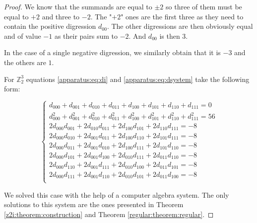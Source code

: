 \begin{proof}
    We know that the summands are equal to $\pm 2$ so three of them must be equal to $+2$ and three to $-2$. The "$+2$" ones are the first three as they need to contain the positive digression $d_{00}$. The other digressions are then obviously equal and of value $-1$ as their pairs sum to $-2$. And $d_{00}$ is then $3$.
    
    In the case of a single negative digression, we similarly obtain that it is $-3$ and the others are $1$.
    
    For $\mathbb Z_2^3$ equations \eqref{apparatus:eq:di} and \eqref{apparatus:eq:dsystem} take the following form:
    
    \begin{equation}
        \begin{cases}
            d_{000} + d_{001} + d_{010} + d_{011} + d_{100} + d_{101} + d_{110} + d_{111} = 0 \\
            d_{000}^2 + d_{001}^2 + d_{010}^2 + d_{011}^2 + d_{100}^2 + d_{101}^2 + d_{110}^2 + d_{111}^2 = 56 \\
            2 d_{000}d_{001} + 2 d_{010}d_{011} + 2 d_{100}d_{101} + 2 d_{110}d_{111} = -8 \\
            2 d_{000}d_{010} + 2 d_{001}d_{011} + 2 d_{100}d_{110} + 2 d_{101}d_{111} = -8 \\
            2 d_{000}d_{011} + 2 d_{001}d_{010} + 2 d_{100}d_{111} + 2 d_{101}d_{110} = -8 \\
            2 d_{000}d_{101} + 2 d_{001}d_{100} + 2 d_{010}d_{111} + 2 d_{011}d_{110} = -8 \\
            2 d_{000}d_{110} + 2 d_{001}d_{111} + 2 d_{010}d_{100} + 2 d_{011}d_{101} = -8 \\
            2 d_{000}d_{111} + 2 d_{001}d_{110} + 2 d_{010}d_{101} + 2 d_{011}d_{100} = -8 \\
        \end{cases}
    \end{equation}
    
    We solved this case with the help of a computer algebra system. The only solutions to this system are the ones presented in Theorem \ref{z2i:theorem:construction} and Theorem \ref{regular:theorem:regular}.
\end{proof}


